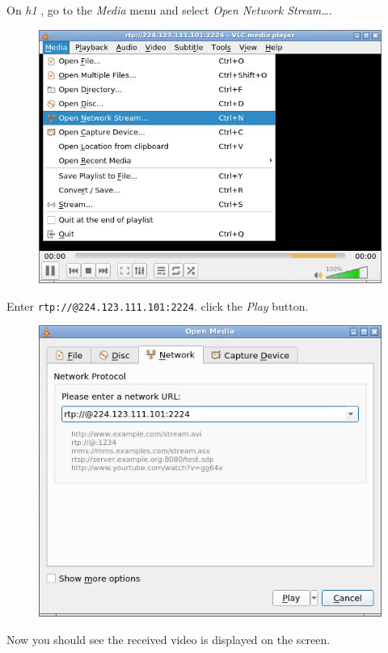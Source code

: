 \documentclass{../UTNetLab}
\begin{document}
On \textit{h1} ,
go to the \textit{Media} menu and select \textit{Open Network Stream\ldots}.
\begin{figure}[H]
    \centering
    \includegraphics[scale=1.8]{img/open-network}
\end{figure}
Enter \texttt{rtp://@224.123.111.101:2224}.
click the \textit{Play} button.
\begin{figure}[H]
    \centering
    \includegraphics[scale=1.9]{img/network}
\end{figure}

Now you should see the received video is displayed on the screen.
\end{document}
